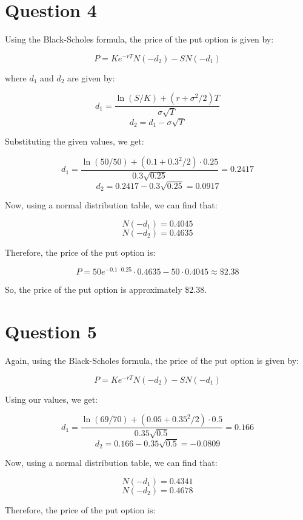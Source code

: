 \documentclass[a4paper]{article}
\begin{document}
\vspace{10mm}
\section*{Question 4}

Using the Black-Scholes formula, the price of the put option is given by:

\[ P = K e^{-rT} N(-d_{2}) - S N(-d_{1}) \]

where $d_{1}$ and $d_{2}$ are given by:

\[ d_{1} = \frac{\ln(S/K) + (r + \sigma^{2}/2)T}{\sigma \sqrt{T}} \]
\[ d_{2} = d_{1} - \sigma \sqrt{T} \]

Substituting the given values, we get:

\[ d_{1} = \frac{\ln(50/50) + (0.1 + 0.3^{2}/2) \cdot 0.25}{0.3 \sqrt{0.25}} = 0.2417 \]
\[ d_{2} = 0.2417 - 0.3 \sqrt{0.25} = 0.0917 \]

Now, using a normal distribution table, we can find that:

\[ N(-d_{1}) = 0.4045 \]
\[ N(-d_{2}) = 0.4635 \]

Therefore, the price of the put option is:

\[ P = 50 e^{-0.1 \cdot 0.25} \cdot 0.4635 - 50 \cdot 0.4045 \approx \$2.38 \]

So, the price of the put option is approximately \$2.38.

\vspace{10mm}
\section*{Question 5}
Again, using the Black-Scholes formula, the price of the put option is given by:

\[ P = K e^{-rT} N(-d_{2}) - S N(-d_{1}) \]

Using our values, we get:

\[ d_{1} = \frac{\ln(69/70) + (0.05 + 0.35^{2}/2) \cdot 0.5}{0.35 \sqrt{0.5}} = 0.166 \]
\[ d_{2} = 0.166 - 0.35 \sqrt{0.5} = -0.0809 \]

Now, using a normal distribution table, we can find that:

\[ N(-d_{1}) = 0.4341 \]
\[ N(-d_{2}) = 0.4678 \]

Therefore, the price of the put option is:
\end{document}

